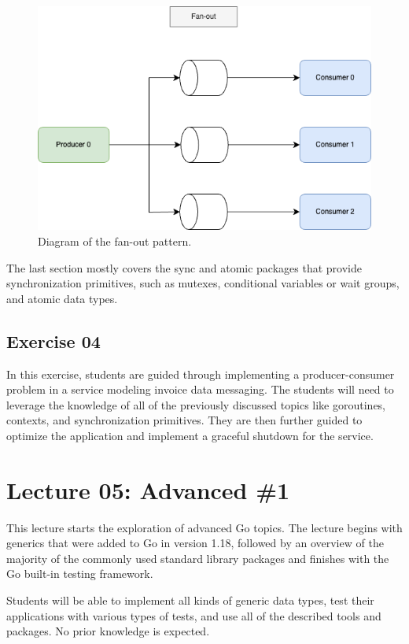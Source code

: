 \documentclass[
  digital,
  color,
  oneside,
  nosansbold,
  nocolorbold,
  nolof,
  nolot,
]{fithesis4}
\begin{document}
\begin{figure}[H]
    \centering
    \includegraphics[width=12cm]{figures/fanout.png}
    \caption{Diagram of the fan-out pattern.}
    \label{fig:fanout}
\end{figure}

The last section mostly covers the sync and atomic packages that provide synchronization primitives, such as mutexes, conditional variables or wait groups, and atomic data types.

\subsection{Exercise 04}

In this exercise, students are guided through implementing a producer-consumer problem in a service modeling invoice data messaging. The students will need to leverage the knowledge of all of the previously discussed topics like goroutines, contexts, and synchronization primitives. They are then further guided to optimize the application and implement a graceful shutdown for the service.

\section{Lecture 05: Advanced \#1}

This lecture starts the exploration of advanced Go topics. The lecture begins with generics that were added to Go in version 1.18, followed by an overview of the majority of the commonly used standard library packages and finishes with the Go built-in testing framework.

Students will be able to implement all kinds of generic data types, test their applications with various types of tests, and use all of the described tools and packages. No prior knowledge is expected.
\end{document}
